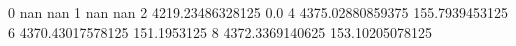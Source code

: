 0 nan nan
1 nan nan
2 4219.23486328125 0.0
4 4375.02880859375 155.7939453125
6 4370.43017578125 151.1953125
8 4372.3369140625 153.10205078125
